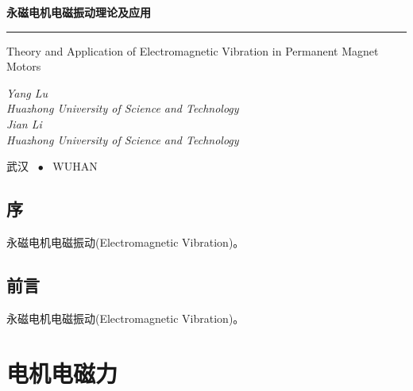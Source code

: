 \documentclass{YangBook}
\begin{document}
\begin{titlepage}
  \vspace*{25ex}

  \hspace{-0.02\textwidth}\begin{minipage}{0.95\textwidth}
    \flushleft

    {\textbf{永磁电机电磁振动理论及应用}}

    \rule{\linewidth}{.5pt}

    \vspace{-1ex}

    \setlength{\baselineskip}{30pt} 
    {\textsf{Theory and Application of Electromagnetic Vibration in Permanent Magnet Motors}} \\
    \par
    \vspace{20ex}

    {\textit{Yang Lu\\[-1ex]
    		Huazhong University of Science and Technology\\
    		\vspace{1ex}
    		Jian Li\\[-2ex]
    	    Huazhong University of Science and Technology}}
  \end{minipage}

  \vfill

  \centering
  {武汉 ~$\bullet$ ~WUHAN}
\end{titlepage}
\thispagestyle{empty}


\frontmatter


\chapter{序}

永磁电机电磁振动(Electromagnetic Vibration)。

\chapter{前言}

永磁电机电磁振动(Electromagnetic Vibration)。

\clearpage
{
  \hypersetup{hidelinks}
  \tableofcontents
}
\mainmatter

\part{电机电磁力}
\end{document}
